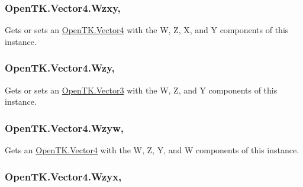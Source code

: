 \hypertarget{struct_open_t_k_1_1_vector4_ae5568f39cb651a34398fb8e1170c9f22}{
\subsubsection[{Wzxy}]{ Open\-T\-K.\-Vector4.\-Wzxy\hspace{0.3cm}{\ttfamily [get]}, {\ttfamily [set]}}}\label{struct_open_t_k_1_1_vector4_ae5568f39cb651a34398fb8e1170c9f22}


Gets or sets an \hyperlink{struct_open_t_k_1_1_vector4}{Open\-T\-K.\-Vector4} with the W, Z, X, and Y components of this instance. 

\hypertarget{struct_open_t_k_1_1_vector4_a21bf7a074dd1f87eda81b1b855e93eff}{
\subsubsection[{Wzy}]{ Open\-T\-K.\-Vector4.\-Wzy\hspace{0.3cm}{\ttfamily [get]}, {\ttfamily [set]}}}\label{struct_open_t_k_1_1_vector4_a21bf7a074dd1f87eda81b1b855e93eff}


Gets or sets an \hyperlink{struct_open_t_k_1_1_vector3}{Open\-T\-K.\-Vector3} with the W, Z, and Y components of this instance. 

\hypertarget{struct_open_t_k_1_1_vector4_a2cf2f785cb9fe64ae8da31c6279ffe1d}{
\subsubsection[{Wzyw}]{ Open\-T\-K.\-Vector4.\-Wzyw\hspace{0.3cm}{\ttfamily [get]}, {\ttfamily [set]}}}\label{struct_open_t_k_1_1_vector4_a2cf2f785cb9fe64ae8da31c6279ffe1d}


Gets an \hyperlink{struct_open_t_k_1_1_vector4}{Open\-T\-K.\-Vector4} with the W, Z, Y, and W components of this instance. 

\hypertarget{struct_open_t_k_1_1_vector4_a4a849cdf66b35ffab07f8fa31954c95e}{
\subsubsection[{Wzyx}]{ Open\-T\-K.\-Vector4.\-Wzyx\hspace{0.3cm}{\ttfamily [get]}, {\ttfamily [set]}}}\label{struct_open_t_k_1_1_vector4_a4a849cdf66b35ffab07f8fa31954c95e}


